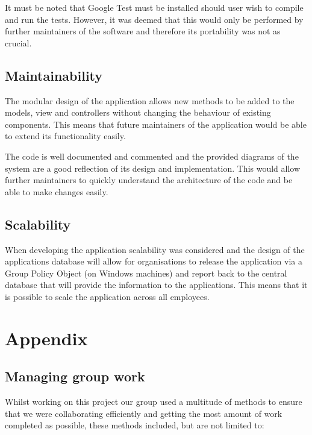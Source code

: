 \documentclass[
  english,
  a4paper,
,tablecaptionabove
]{scrartcl}
\begin{document}
It must be noted that Google Test must be installed should user wish to
compile and run the tests. However, it was deemed that this would only
be performed by further maintainers of the software and therefore its
portability was not as crucial.

\hypertarget{maintainability}{%
\subsection{Maintainability}\label{maintainability}}

The modular design of the application allows new methods to be added to
the models, view and controllers without changing the behaviour of
existing components. This means that future maintainers of the
application would be able to extend its functionality easily.

The code is well documented and commented and the provided diagrams of
the system are a good reflection of its design and implementation. This
would allow further maintainers to quickly understand the architecture
of the code and be able to make changes easily.

\hypertarget{scalability}{%
\subsection{Scalability}\label{scalability}}

When developing the application scalability was considered and the
design of the applications database will allow for organisations to
release the application via a Group Policy Object (on Windows machines)
and report back to the central database that will provide the
information to the applications. This means that it is possible to scale
the application across all employees.

\newpage

\hypertarget{appendix}{%
\section{Appendix}\label{appendix}}

\hypertarget{managing-group-work}{%
\subsection{Managing group work}\label{managing-group-work}}

Whilst working on this project our group used a multitude of methods to
ensure that we were collaborating efficiently and getting the most
amount of work completed as possible, these methods included, but are
not limited to:
\end{document}
